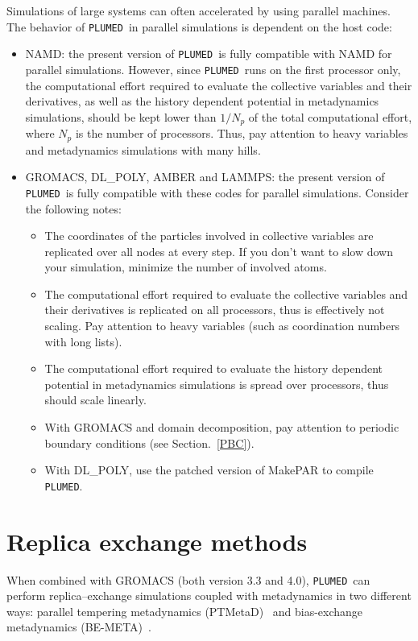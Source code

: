 \documentclass[12pt,fleqn]{report}
\newcommand{\plumed}{{\tt PLUMED}}
\begin{document}
Simulations of large systems can often accelerated by using parallel machines.
The behavior of \plumed \ in parallel simulations is dependent on the host code:
\begin{itemize}
\item NAMD: the present version of \plumed \ is fully compatible with NAMD for parallel simulations. However, since
\plumed \ runs on the first processor only, the computational effort required to evaluate the collective variables and their
derivatives, as well as the history dependent potential in metadynamics simulations, should be kept
lower than $1/N_p$ of the total computational effort, where $N_p$ is the number of processors.
Thus, pay attention to heavy variables and metadynamics simulations with many hills.
\item GROMACS, DL\_POLY, AMBER and LAMMPS: the present version of \plumed \  is fully compatible with these codes for parallel simulations.
Consider the following notes:
\begin{itemize}
\item The coordinates of the particles involved in collective variables are replicated over all nodes
at every step. If you don't want to slow down your simulation, minimize the number of involved atoms.
\item The computational effort required to evaluate the collective variables and their
derivatives is replicated on all processors, thus is effectively not scaling. Pay attention to
heavy variables (such as coordination numbers with long lists).
\item The computational effort required to evaluate the history dependent potential
in metadynamics simulations is spread over processors, thus should scale linearly.
\item With GROMACS and domain decomposition, pay attention to periodic boundary conditions (see Section.~\ref{PBC}).
\item With DL\_POLY, use the patched version of MakePAR to compile \plumed.
\end{itemize}
\end{itemize}

\section{Replica exchange methods}

When combined with GROMACS (both version 3.3 and 4.0), \plumed \  can perform replica--exchange
simulations coupled with metadynamics in two different ways:
parallel tempering metadynamics (PTMetaD)~\cite{bussi_xc,camilloni_protG} and
bias-exchange metadynamics (BE-META)~\cite{piana}.
\end{document}
